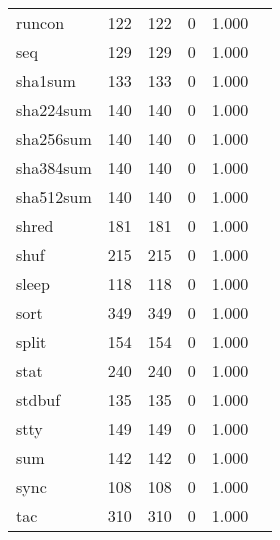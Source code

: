 \begin{longtable}{lp{2.20cm}p{2.20cm}p{2.20cm}p{2.20cm}p{2.20cm}}
runcon    &                     122 &              122 &                 0 &                        1.000 \\
seq       &                     129 &              129 &                 0 &                        1.000 \\
sha1sum   &                     133 &              133 &                 0 &                        1.000 \\
sha224sum &                     140 &              140 &                 0 &                        1.000 \\
sha256sum &                     140 &              140 &                 0 &                        1.000 \\
sha384sum &                     140 &              140 &                 0 &                        1.000 \\
sha512sum &                     140 &              140 &                 0 &                        1.000 \\
shred     &                     181 &              181 &                 0 &                        1.000 \\
shuf      &                     215 &              215 &                 0 &                        1.000 \\
sleep     &                     118 &              118 &                 0 &                        1.000 \\
sort      &                     349 &              349 &                 0 &                        1.000 \\
split     &                     154 &              154 &                 0 &                        1.000 \\
stat      &                     240 &              240 &                 0 &                        1.000 \\
stdbuf    &                     135 &              135 &                 0 &                        1.000 \\
stty      &                     149 &              149 &                 0 &                        1.000 \\
sum       &                     142 &              142 &                 0 &                        1.000 \\
sync      &                     108 &              108 &                 0 &                        1.000 \\
tac       &                     310 &              310 &                 0 &                        1.000 \\

\end{longtable}

